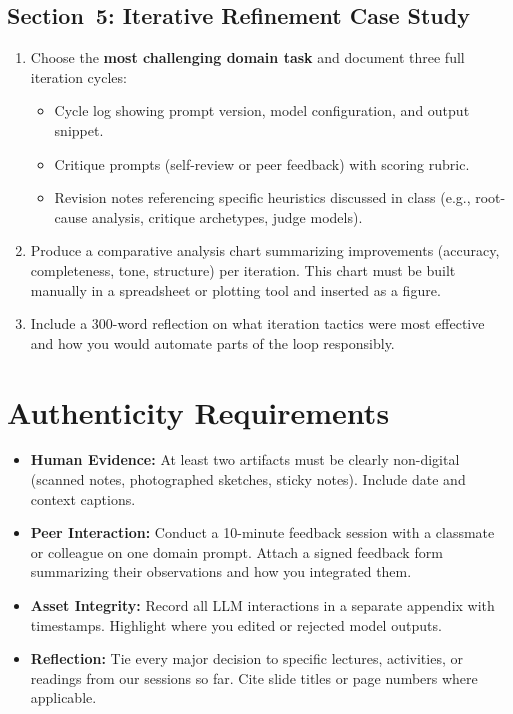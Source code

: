 \documentclass[11pt]{article}
\begin{document}
\subsection{Section~5: Iterative Refinement Case Study}
\begin{enumerate}[label=5.\arabic*]
    \item Choose the \textbf{most challenging domain task} and document three full iteration cycles:
    \begin{itemize}
        \item Cycle log showing prompt version, model configuration, and output snippet.
        \item Critique prompts (self-review or peer feedback) with scoring rubric.
    \item Revision notes referencing specific heuristics discussed in class (e.g., root-cause analysis, critique archetypes, judge models).
    \end{itemize}
    \item Produce a comparative analysis chart summarizing improvements (accuracy, completeness, tone, structure) per iteration. This chart must be built manually in a spreadsheet or plotting tool and inserted as a figure.
    \item Include a 300-word reflection on what iteration tactics were most effective and how you would automate parts of the loop responsibly.
\end{enumerate}

\section{Authenticity Requirements}
\begin{itemize}
    \item \textbf{Human Evidence:} At least two artifacts must be clearly non-digital (scanned notes, photographed sketches, sticky notes). Include date and context captions.
    \item \textbf{Peer Interaction:} Conduct a 10-minute feedback session with a classmate or colleague on one domain prompt. Attach a signed feedback form summarizing their observations and how you integrated them.
    \item \textbf{Asset Integrity:} Record all LLM interactions in a separate appendix with timestamps. Highlight where you edited or rejected model outputs.
    \item \textbf{Reflection:} Tie every major decision to specific lectures, activities, or readings from our sessions so far. Cite slide titles or page numbers where applicable.
\end{itemize}
\end{document}
